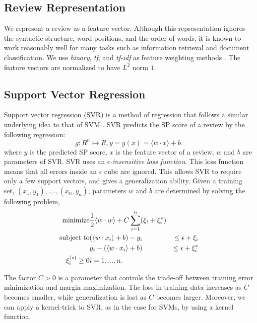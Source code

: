 \documentclass[japanese]{jnlp_1.3d}
\begin{document}
\subsection{Review Representation}
\label{representation}
We represent a review as a feature vector. Although this representation ignores the syntactic structure, word positions, and the order of words, it is known to work reasonably well for many tasks such as information retrieval and document classification. We use \textit{binary}, \textit{tf}, and \textit{tf-idf} as feature weighting methods \cite{Sebastiani2002}. The feature vectors are normalized to have $L^2$ norm $1$. 

\subsection{Support Vector Regression}
\label{sec:svr}
Support vector regression (SVR) is a method of regression that follows a similar underlying idea to that of SVM \cite{Cristianini2000,Smola98}. SVR predicts the SP score of a review by the following regression:
\begin{equation}
\label{svr}
g: R^n \mapsto R, y = g(x) = \langle w \cdot x \rangle + b.
\end{equation}
where $y$ is the predicted SP score, $x$ is the feature vector of a review, $w$ and $b$ are parameters of SVR.
SVR uses an \textit{$\epsilon$-insensitive loss function}. This loss function means that all errors inside an $\epsilon$ cube are ignored. This allows SVR to require only a few support vectors, and gives a generalization ability. Given a training set, $(x_1,y_1),....,(x_n,y_n)$, parameters $w$ and $b$ are determined by solving the following problem,
\begin{eqnarray}
\label{SVRmain}
\notag
\text{minimize} & \displaystyle{\frac{1}{2} \langle w \cdot w \rangle + C \sum_{i=1}^{n}(\xi_i + \xi_i^*)}\\
\notag
\text{subject to} & (\langle w \cdot x_i \rangle + b) - y_i & \le \epsilon + \xi_i \\
\notag
                  & y_i - (\langle w \cdot x_i \rangle + b) & \le \epsilon + \xi_i^*\\
                  \xi_i^{(*)} \ge 0 & i = 1,...,n.
\end{eqnarray}

The factor $C>0$ is a parameter that controls the trade-off between training error minimization and margin maximization. The loss in training data increases as $C$ becomes smaller, while generalization is lost as $C$ becomes larger. Moreover, we can apply a kernel-trick to SVR, as in the case for SVMs, by using a kernel function.
\end{document}
